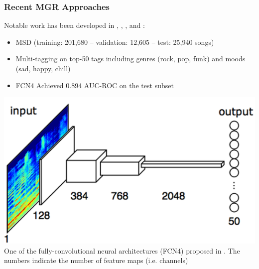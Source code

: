 \documentclass[hyperref={pdfpagelabels=false}]{beamer}
\begin{document}
     \begin{frame}
       \frametitle{Recent MGR Approaches}
       Notable work has been developed in \cite{choi-fcn}, \cite{choi-crnn}, \cite{choi-robustness}, \cite{choi-explaining} and \cite{convtransfer}:
       \begin{itemize}
       \item MSD (training: 201,680 --  validation: 12,605 -- test: 25,940 songs)
       \item Multi-tagging on top-50 tags including genres (rock, pop, funk) and moods (sad, happy, chill)
       \item FCN4 Achieved 0.894 AUC-ROC on the test subset
       \end{itemize}
          \centering
          \includegraphics[scale=0.3]{fullyconv.png}
         \\\scriptsize{One of the fully-convolutional neural architectures (FCN4) proposed in \cite{choi-fcn}. The numbers indicate the number of feature maps (i.e. channels)}
     \end{frame}
\end{document}
